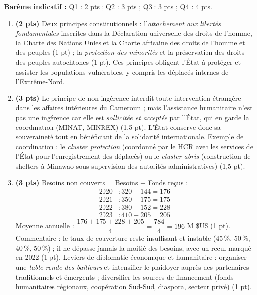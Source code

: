 \documentclass[11pt]{article}
\begin{document}
\begin{corrige}
\textbf{Barème indicatif :} Q1 : 2 pts ; Q2 : 3 pts ; Q3 : 3 pts ; Q4 : 4 pts.

\begin{enumerate}
    \item \textbf{(2 pts)} Deux principes constitutionnels : l'\emph{attachement aux libertés fondamentales} inscrites dans la Déclaration universelle des droits de l'homme, la Charte des Nations Unies et la Charte africaine des droits de l'homme et des peuples (1 pt) ; la \emph{protection des minorités} et la préservation des droits des peuples autochtones (1 pt). Ces principes obligent l'État à protéger et assister les populations vulnérables, y compris les déplacés internes de l'Extrême-Nord.
    \item \textbf{(3 pts)} Le principe de non-ingérence interdit toute intervention étrangère dans les affaires intérieures du Cameroun ; mais l'assistance humanitaire n'est pas une ingérence car elle est \emph{sollicitée et acceptée} par l'État, qui en garde la coordination (MINAT, MINREX) (1,5 pt). L'État conserve donc sa souveraineté tout en bénéficiant de la solidarité internationale. Exemple de coordination : le \emph{cluster protection} (coordonné par le HCR avec les services de l'État pour l'enregistrement des déplacés) ou le \emph{cluster abris} (construction de shelters à Minawao sous supervision des autorités administratives) (1,5 pt).
    \item \textbf{(3 pts)} Besoins non couverts = Besoins $-$ Fonds reçus :
    \begin{align*}
    2020 &: 320 - 144 = 176 \\
    2021 &: 350 - 175 = 175 \\
    2022 &: 380 - 152 = 228 \\
    2023 &: 410 - 205 = 205
    \end{align*}
    Moyenne annuelle : $\dfrac{176 + 175 + 228 + 205}{4} = \dfrac{784}{4} = 196$ M \$US (1 pt).
    Commentaire : le taux de couverture reste insuffisant et instable (45\,\%, 50\,\%, 40\,\%, 50\,\%) ; il ne dépasse jamais la moitié des besoins, avec un recul marqué en 2022 (1 pt). Leviers de diplomatie économique et humanitaire : organiser une \emph{table ronde des bailleurs} et intensifier le plaidoyer auprès des partenaires traditionnels et émergents ; diversifier les sources de financement (fonds humanitaires régionaux, coopération Sud-Sud, diaspora, secteur privé) (1 pt).

\end{enumerate}
\end{corrige}
\end{document}
